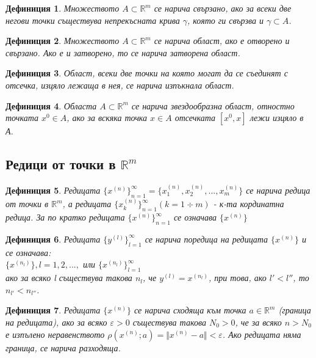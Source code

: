 \documentclass[a4paper,fleqn,12pt]{article}
\newtheorem{definition}{Дефиниция}[subsection]
\theoremstyle{definition}
\begin{document}
\begin{definition}
Множеството  $A \subset \mathbb{R}^m $ се нарича свързано,  ако за всеки две негови точки съществува непрекъсната крива $\gamma$, която ги свързва и $\gamma \subset A$.
\end{definition}

\begin{definition}
Множеството  $A \subset \mathbb{R}^m $ се нарича област, ако е отворено и свързано. Ако е и затворено, то се нарича затворена област. 
\end{definition}

\begin{definition}
Област, всеки две точки на която могат да се съединят с отсечка, изцяло лежаща в нея, се нарича изпъкнала област. 
\end{definition}

\begin{definition}
Областа $A \subset \mathbb{R}^m $ се нарича звездообразна област, отностно точката $x^0 \in A$, ако за вскяка точка $x \in A$ отсечката $[x^0,x]$ лежи изцяло в А. 
\end{definition}

\subsection{Редици от точки в $\mathbb{R}^m$}

\begin{definition}
Редицата $\{ x^{(n)} \}_{n = 1} ^ \infty = \{x_1 ^{(n)}, x_2 ^{(n)}, ... , x_m^{(n)}\} $ се нарича редица от точки в $\mathbb{R}^m$, а редицата $\{ x_k ^{(n)}\}_{n=1} ^ \infty ( k = 1 \div m) $ - к-та кординатна редица. За по кратко редицата $\{ x^{(n)} \}_{n = 1} ^ \infty$ се означава $\{ x^{(n)} \}$
\end{definition}

\begin{definition}
Редицата $\{ y^{(l)} \}_{l = 1} ^ \infty$ се нарича поредица на редицата $\{ x^{(n)} \}$ и се означава:\\
$\{ x^{(n_l)} \}, l = 1, 2, ..., $ или $\{ x^{(n_l)} \}_{l = 1} ^ \infty$\\
ако за всяко l съществува такова $n_l$, че $y^{(l)} = x^{(n_l)}$, при това, ако $l' < l'' $, то $n_{l'}<n_{l''}$.
\end{definition}

\begin{definition}
Редицата $\{ x^{(n)} \}$ се нарича сходяща към точка $a \in \mathbb{R}^m$ (граница на редицата), ако за всяко $\varepsilon > 0$ съществува такова $N_0 > 0$, че за всяко $n > N_0$ е изпълено неравенството $\rho(x^{(n)};a) = \Vert x^{(n)} - a \Vert < \varepsilon$. Ако редицата няма граница, се нарича разходяща. 
\end{definition}
\end{document}
